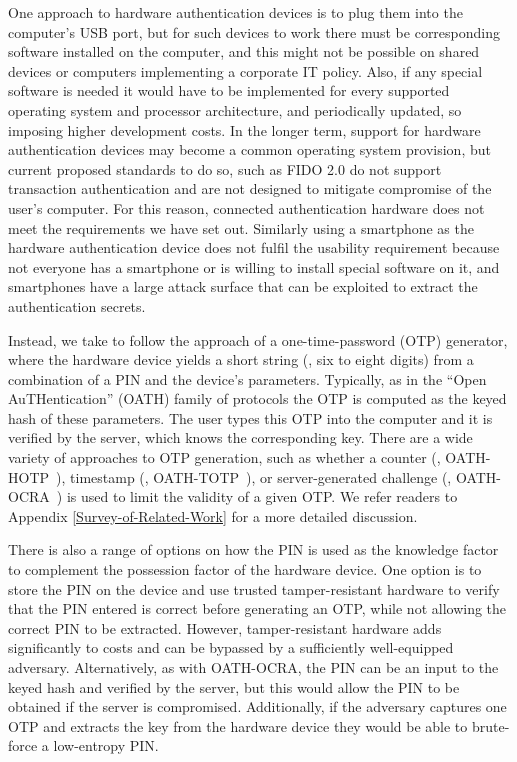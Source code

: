 One approach to hardware authentication devices is to plug them into the computer's USB port, but for such devices to work there must be corresponding software installed on the computer, and this might not be possible on shared devices or computers implementing a corporate IT policy.
Also, if any special software is needed it would have to be implemented for every supported operating system and processor architecture, and periodically updated, so imposing higher development costs.
In the longer term, support for hardware authentication devices may become a common operating system provision, but current proposed standards to do so, such as FIDO 2.0 do not support transaction authentication and are not designed to mitigate compromise of the user's computer.
For this reason, connected authentication hardware does not meet the requirements we have set out.
Similarly using a smartphone as the hardware authentication device does not fulfil the usability requirement because not everyone has a smartphone or is willing to install special software on it, and smartphones have a large attack surface that can be exploited to extract the authentication secrets.

Instead, we take to follow the approach of a one-time-password (OTP) generator, where the hardware device yields a short string (\eg, six to eight digits) from a combination of a PIN and the device's parameters. Typically, as in the ``Open AuTHentication'' (OATH) family of protocols the OTP is computed as the keyed hash of these parameters. The user types this OTP into the computer and it is verified by the server, which knows the corresponding key. There are a wide variety of approaches to OTP generation, such as whether a counter (\eg, OATH-HOTP~\cite{oath-hotp}), timestamp (\eg, OATH-TOTP~\cite{oath-totp}), or server-generated challenge (\eg, OATH-OCRA~\cite{oath-ocra}) is used to limit the validity of a given OTP.  We refer readers to Appendix \ref{Survey-of-Related-Work} for a more detailed discussion.

There is also a range of options on how the PIN is used as the knowledge factor to complement the possession factor of the hardware device.
One option is to store the PIN on the device and use trusted tamper-resistant hardware to verify that the PIN entered is correct before generating an OTP, while not allowing the correct PIN to be extracted.
However, tamper-resistant hardware adds significantly to costs and can be bypassed by a sufficiently well-equipped adversary.
Alternatively, as with OATH-OCRA, the PIN can be an input to the keyed hash and verified by the server, but this would allow the PIN to be obtained if the server is compromised.
Additionally, if the adversary captures one OTP and extracts the key from the hardware device they would be able to brute-force a low-entropy PIN.


